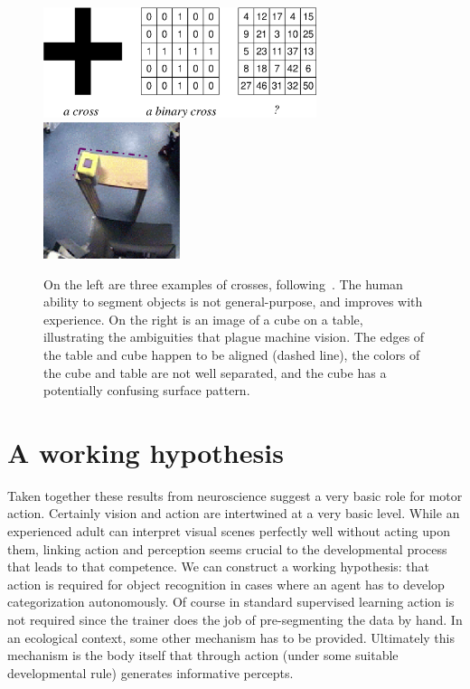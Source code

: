 %
\begin{figure}[tb]
\begin{center}
\includegraphics[width=8.0cm]{number-cross.eps}
\hspace{2cm}
\includegraphics[width=4cm]{setup-sequence.eps}
\caption{ 
\label{fig:number-cross}
%
On the left are three examples of crosses,
following~\cite{manzotti01coscienza}.  The human ability to segment
objects is not general-purpose, and improves with experience.
On the right is an image of a cube on a table, illustrating the
ambiguities that plague machine vision. 
The edges of the table and cube happen to be
aligned (dashed line), the colors of the cube and table are not well
separated, and the cube has a potentially confusing surface pattern.
%
}
\end{center}
\end{figure}
%
%

\fi



%
%
%







\section{A working hypothesis}


Taken together these results from neuroscience suggest a very basic role
for motor action. Certainly vision and action are
intertwined at a very basic level.  While an
experienced adult can interpret visual scenes perfectly well without
acting upon them, linking action and perception seems crucial to the
developmental process that leads to that competence.  We can construct
a working hypothesis: that action is required for object recognition in
cases where an agent has to develop categorization autonomously. 
Of course in standard supervised learning action is not required since
the trainer does the job of pre-segmenting the data by hand.  In an
ecological context, some other mechanism has to be provided.
Ultimately this mechanism is the body itself that through action
(under some suitable developmental rule) generates informative
percepts.

